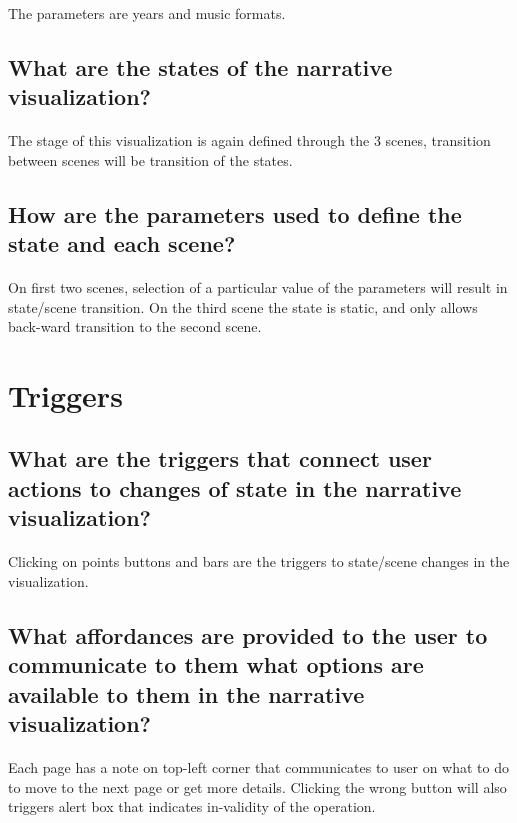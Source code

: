 \documentclass[letterpaper, 11pt]{article}
\begin{document}
\paragraph{}The parameters are years and music formats.
\subsection{What are the states of the narrative visualization?}
\label{subsec:Parameters2}
\paragraph{}The stage of this visualization is again defined through the 3 scenes, transition between scenes will be transition of the states.
\subsection{How are the parameters used to define the state and each scene?}
\label{subsec:Parameters3}
\paragraph{}On first two scenes, selection of a particular value of the parameters will result in state/scene transition. On the third scene the state is static, and only allows back-ward transition to the second scene.

\section{Triggers}
\label{sec:Triggers}
\subsection{What are the triggers that connect user actions to changes of state in the narrative visualization?}
\label{subsec:Triggers1}
\paragraph{}Clicking on points buttons and bars are the triggers to state/scene changes in the visualization.
\subsection{What affordances are provided to the user to communicate to them what options are available to them in the narrative visualization?}
\label{subsec:Triggers2}
\paragraph{}Each page has a note on top-left corner that communicates to user on what to do to move to the next page or get more details. 
Clicking the wrong button will also triggers alert box that indicates in-validity of the operation.



% 
% 
\end{document}
